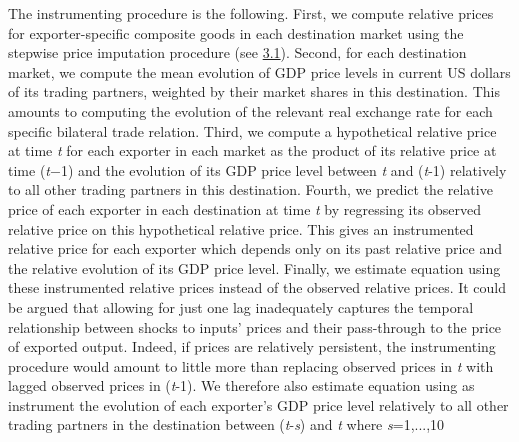\documentclass[12pt,twoside,a4paper,notitlepage]{article}
\begin{document}
{The instrumenting procedure is the following.
First, we compute relative prices for exporter-specific composite goods in each destination market using the stepwise price imputation procedure (see {\hyperref[ref-004]{3.1}}).
Second, for each destination market, we compute the mean evolution of GDP price levels in current US dollars of its trading partners, weighted by their market shares in this destination.
This amounts to computing the evolution of the relevant real exchange rate for each specific bilateral trade relation.
Third, we compute a hypothetical relative price at time \textit{t} for each exporter in each market as the product of its relative price at time (\textit{t}${-}$1) and the evolution of its GDP price level between \textit{t} and (\textit{t}-1) relatively to all other trading partners in this destination.
Fourth, we predict the relative price of each exporter in each destination at time \textit{t} by regressing its observed relative price on this hypothetical relative price.
This gives an instrumented relative price for each exporter which depends only on its past relative price and the relative evolution of its GDP price level.
Finally, we estimate equation {\hyperref[ref-002]{ }} using these instrumented relative prices instead of the observed relative prices.
It could be argued that allowing for just one lag inadequately captures the temporal relationship between shocks to inputs' prices and their pass-through to the price of exported output.
Indeed, if prices are relatively persistent, the instrumenting procedure would amount to little more than replacing observed prices in \textit{t} with lagged observed prices in (\textit{t}-1).
We therefore also estimate equation {\hyperref[ref-002]{ }} using as instrument the evolution of each exporter's GDP price level relatively to all other trading partners in the destination between (\textit{t}-\textit{s}) and \textit{t} where \textit{s}=1,...,10

}
\end{document}
